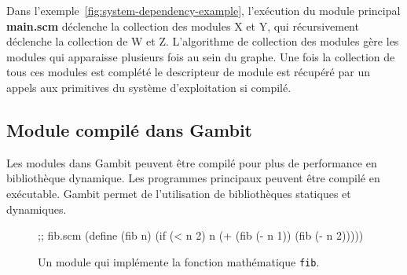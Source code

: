 Dans l'exemple~\ref{fig:system-dependency-example}, l'exécution du module principal
\textbf{main.scm} déclenche la collection des modules X et Y, qui récursivement
déclenche la collection de W et Z.  L'algorithme de collection des modules gère
les modules qui apparaisse plusieurs fois au sein du graphe.  Une fois la
collection de tous ces modules est complété le descripteur de module est
récupéré par un appels aux primitives du système d'exploitation si compilé.


\subsection{Module compilé dans Gambit}

Les modules dans Gambit peuvent être compilé pour plus de performance en
bibliothèque dynamique. Les programmes principaux peuvent être compilé en
exécutable.  Gambit permet de l'utilisation de bibliothèques statiques et
dynamiques.\\

\begin{figure}[ht]
  \centering

  \begin{mplisting}{0.5}
;; fib.scm
(define (fib n)
  (if (< n 2)
      n
      (+ (fib (- n 1))
         (fib (- n 2)))))
\end{mplisting}
  \caption{Un module qui implémente la fonction mathématique \texttt{fib}.}
  \label{fig:basic_fib_module}
\end{figure}

